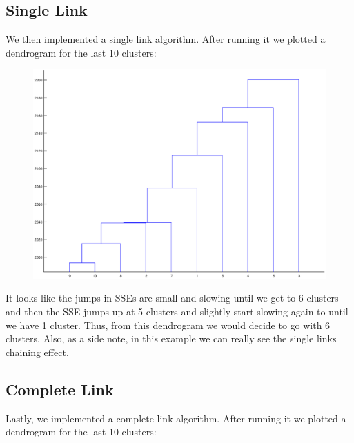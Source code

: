 \documentclass{article}
\begin{document}
\subsection{Single Link}

We then implemented a single link algorithm. After running it we plotted a dendrogram for the last 10 clusters:
	
		\begin{figure}[h!]
		\begin{center} 
			\includegraphics[scale=0.4]{single.eps} 
		\end{center}  
		\label{fig:M7}
	\end{figure}
	
	It looks like the jumps in SSEs are small and slowing until we get to 6 clusters and then the SSE jumps up at 5 clusters and slightly start slowing again to until we have 1 cluster. Thus, from this dendrogram we would decide to go with 6 clusters. Also, as a side note, in this example we can really see the single links chaining effect. 
	
	\subsection{Complete Link}
	
	Lastly, we implemented a complete link algorithm. After running it we plotted a dendrogram for the last 10 clusters:
	
\end{document}
